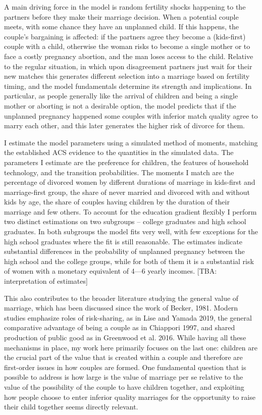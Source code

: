 \documentclass[12pt,letter]{article}
\begin{document}
A main driving force in the model is random fertility shocks happening to the partners before they make their marriage decision. When a potential couple meets, with some chance they have an unplanned child. If this happens, the couple's bargaining is affected: if the partners agree they become a (kids-first) couple with a child, otherwise the woman risks to become a single mother or to face a costly pregnancy abortion, and the man loses access to the child. Relative to the regular situation, in which upon disagreement partners just wait for their new matches this generates different selection into a marriage based on fertility timing, and the model fundamentals determine its strength and implications. In particular, as people generally like the arrival of children and being a single mother or aborting is not a desirable option, the model predicts that if the unplanned pregnancy happened some couples with inferior match quality agree to marry each other, and this later generates the higher risk of divorce for them.

I estimate the model parameters using a simulated method of moments, matching the established ACS evidence to the quantities in the simulated data. The parameters I estimate are the preference for children, the features of household technology, and the transition probabilities. The moments I match are the percentage of divorced women by different durations of marriage in kids-first and marriage-first group, the share of never married and divorced with and without kids by age, the share of couples having children by the duration of their marriage and few others. To account for the education gradient flexibly I perform two distinct estimations on two subgroups -- college graduates and high school graduates. In both subgroups the model fits very well, with few exceptions for the high school graduates where the fit is still reasonable. The estimates indicate substantial differences in the probability of unplanned pregnancy between the high school and the college groups, while for both of them it is a substantial risk of women with a monetary equivalent of 4---6 yearly incomes. [TBA: interpretation of estimates]

This also contributes to the broader literature studying the general value of marriage, which has been discussed since the work of Becker, 1981. Modern studies emphasize roles of risk-sharing, as in Lise and Yamada 2019, the general comparative advantage of being a couple as in Chiappori 1997, and shared production of public good as in Greenwood et al. 2016. While having all these mechanisms in place, my work here primarily focuses on the last one: children are the crucial part of the value that is created within a couple and therefore are first-order issues in how couples are formed. One fundamental question that is possible to address is how large is the value of marriage per se relative to the value of the possibility of the couple to have children together, and exploiting how people choose to enter inferior quality marriages for the opportunity to raise their child together seems directly relevant.
\end{document}
